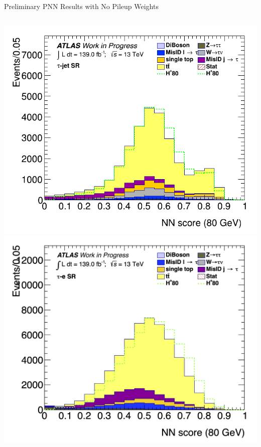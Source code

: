\documentclass[aspectratio=169,xcolor=table]{beamer}
\begin{document}
    \begin{frame}{Preliminary PNN Results with No Pileup Weights}
      \begin{columns}
        \includegraphics[height=.4\textheight,keepaspectratio=true]{Scores/taujet/rnnTest_1p_3p_noweight/clf_score_GB200_mass_80to80_SR_TAUJET.png}
        \includegraphics[height=.4\textheight,keepaspectratio=true]{Scores/taulep/myOutDirClfEval_1p_noUpsilon_test_full/clf_score_GB200_mass_80to80_SR_TAUEL.png}


\end{columns}
\end{frame}
\end{document}

